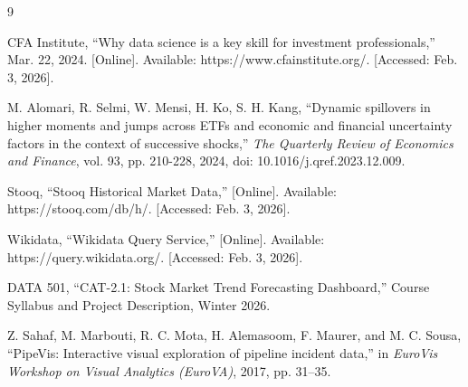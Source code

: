 \documentclass{article}
\begin{document}
\begin{thebibliography}{9}

CFA Institute, ``Why data science is a key skill for investment professionals,'' Mar. 22, 2024. [Online]. Available: https://www.cfainstitute.org/. [Accessed: Feb. 3, 2026].

M. Alomari, R. Selmi, W. Mensi, H. Ko, S. H. Kang, ``Dynamic spillovers in higher moments and jumps across ETFs and economic and financial uncertainty factors in the context of successive shocks,'' \textit{The Quarterly Review of Economics and Finance}, vol. 93, pp. 210-228, 2024, doi: 10.1016/j.qref.2023.12.009.

Stooq, ``Stooq Historical Market Data,'' [Online]. Available: https://stooq.com/db/h/. [Accessed: Feb. 3, 2026].

Wikidata, ``Wikidata Query Service,'' [Online]. Available: https://query.wikidata.org/. [Accessed: Feb. 3, 2026].

DATA 501, ``CAT-2.1: Stock Market Trend Forecasting Dashboard,'' Course Syllabus and Project Description, Winter 2026.

Z. Sahaf, M. Marbouti, R. C. Mota, H. Alemasoom, F. Maurer, and M. C. Sousa, ``PipeVis: Interactive visual exploration of pipeline incident data,'' in \textit{EuroVis Workshop on Visual Analytics (EuroVA)}, 2017, pp. 31–35.

\end{thebibliography}
\end{document}
